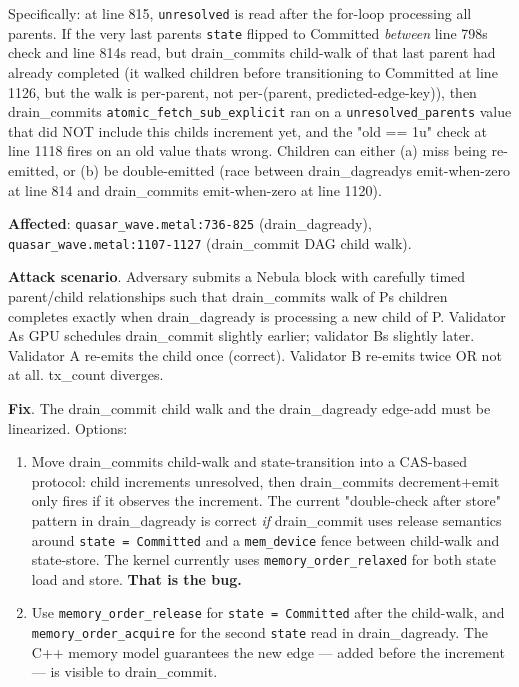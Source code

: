 \documentclass[
]{article}
\providecommand{\tightlist}{%
  \setlength{\itemsep}{0pt}\setlength{\parskip}{0pt}}
\begin{document}
Specifically: at line 815, \texttt{unresolved} is read after the
for-loop processing all parents. If the very last
parent\textquotesingle s \texttt{state} flipped to Committed
\emph{between} line 798\textquotesingle s check and line
814\textquotesingle s read, but drain\_commit\textquotesingle s
child-walk of that last parent had already completed (it walked children
before transitioning to Committed at line 1126, but the walk is
per-parent, not per-(parent, predicted-edge-key)), then
drain\_commit\textquotesingle s \texttt{atomic\_fetch\_sub\_explicit}
ran on a \texttt{unresolved\_parents} value that did NOT include this
child\textquotesingle s increment yet, and the "old == 1u" check at line
1118 fires on an old value that\textquotesingle s wrong. Children can
either (a) miss being re-emitted, or (b) be double-emitted (race between
drain\_dagready\textquotesingle s emit-when-zero at line 814 and
drain\_commit\textquotesingle s emit-when-zero at line 1120).

\textbf{Affected}: \texttt{quasar\_wave.metal:736-825}
(drain\_dagready), \texttt{quasar\_wave.metal:1107-1127} (drain\_commit
DAG child walk).

\textbf{Attack scenario}. Adversary submits a Nebula block with
carefully timed parent/child relationships such that
drain\_commit\textquotesingle s walk of P\textquotesingle s children
completes exactly when drain\_dagready is processing a new child of P.
Validator A\textquotesingle s GPU schedules drain\_commit slightly
earlier; validator B\textquotesingle s slightly later. Validator A
re-emits the child once (correct). Validator B re-emits twice OR not at
all. tx\_count diverges.

\textbf{Fix}. The drain\_commit child walk and the drain\_dagready
edge-add must be linearized. Options:

\begin{enumerate}
\def\labelenumi{\arabic{enumi}.}
\tightlist
\item
  Move drain\_commit\textquotesingle s child-walk and state-transition
  into a CAS-based protocol: child increments unresolved, then
  drain\_commit\textquotesingle s decrement+emit only fires if it
  observes the increment. The current "double-check after store" pattern
  in drain\_dagready is correct \emph{if} drain\_commit uses release
  semantics around \texttt{state\ =\ Committed} and a
  \texttt{mem\_device} fence between child-walk and state-store. The
  kernel currently uses \texttt{memory\_order\_relaxed} for both state
  load and store. \textbf{That is the bug.}
\item
  Use \texttt{memory\_order\_release} for \texttt{state\ =\ Committed}
  after the child-walk, and \texttt{memory\_order\_acquire} for the
  second \texttt{state} read in drain\_dagready. The C++ memory model
  guarantees the new edge --- added before the increment --- is visible
  to drain\_commit.
\end{enumerate}
\end{document}
